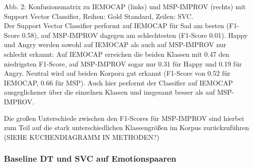 \documentclass{article} %
\begin{document}
Abb. 2: Konfusionsmatrix zu IEMOCAP (links) und MSP-IMPROV (rechts) mit Support Vector Classifier, Reihen: Gold Standard, Zeilen: SVC. \\

Der Support Vector Classifier performt auf IEMOCAP für Sad am besten (F1-Score 0.58), auf MSP-IMPROV dagegen am schlechtesten (F1-Score 0.01). Happy und Angry werden sowohl auf IEMOCAP als auch auf MSP-IMPROV nur schlecht erkannt: Auf IEMOCAP erreichen die beiden Klassen mit 0.47 den niedrigsten F1-Score, auf MSP-IMPROV sogar nur 0.31 für Happy und 0.19 für Angry. 
Neutral wird auf beiden Korpora gut erkannt (F1-Score von 0.52 für IEMOCAP, 0.66 für MSP). Auch hier performt der Classifier auf IEMOCAP ausgeglichener über die einzelnen Klassen und insgesamt besser als auf MSP-IMPROV. 

Die großen Unterschiede zwischen den F1-Scores für MSP-IMPROV sind hierbei zum Teil auf die stark unterschiedlichen Klassengrößen im Korpus zurückzuführen (SIEHE KUCHENDIAGRAMM IN METHODEN?)

\subsubsection{Baseline DT und SVC auf Emotionspaaren}
\end{document}
